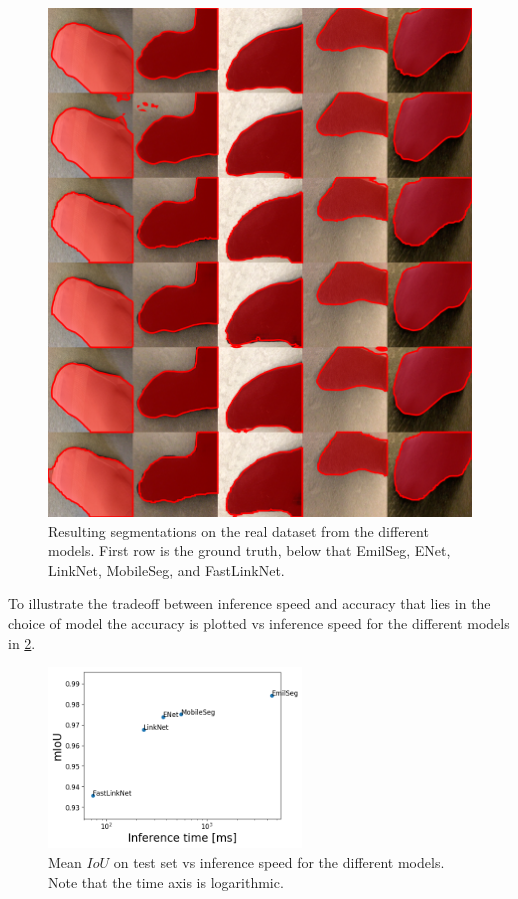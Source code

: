 \documentclass{kththesis}
\begin{document}
\begin{figure}[h]
  \centering
  \includegraphics[width=\textwidth]{real_color}
  \caption{Resulting segmentations on the real dataset from the different models. First row is the ground
    truth, below that EmilSeg, ENet, LinkNet, MobileSeg, and FastLinkNet.}
  \label{fig:seg_real}
  \end{figure}

To illustrate the tradeoff between inference speed and accuracy that lies in
the choice of model the accuracy is plotted vs inference speed for the different
models in \cref{fig:speed_vs_iou}.

\begin{figure}[h]
  \centering
  \includegraphics[width=0.6\textwidth]{Speed_vs_IoU}
  \caption{Mean \(IoU\) on test set vs inference speed for the different models. Note that
    the time axis is logarithmic.}
  \label{fig:speed_vs_iou}
\end{figure}
\end{document}
